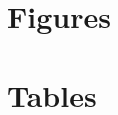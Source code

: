 \documentclass[utf8]{FrontiersinHarvard} %
\begin{document}

\clearpage
\section*{Figures}




\section*{Tables}

\end{document}
